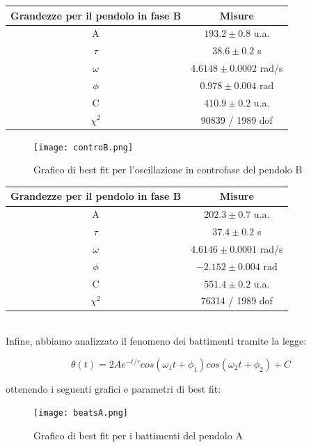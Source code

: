 \documentclass{article}
\begin{document}
\begin{center}
\begin{tabular}{cc}
    \toprule
    Grandezze per il pendolo in fase B & Misure \\
     \midrule
    A & $193.2 \pm 0.8$ u.a.\\
    $\tau$ & $38.6 \pm 0.2$ s\\
    $\omega$ & $4.6148 \pm 0.0002$ rad/s\\
    $\phi$ & $0.978 \pm 0.004$ rad\\
    C & $410.9 \pm 0.2$ u.a.\\
    $\chi^2$ & 90839 / 1989 dof\\
    \bottomrule
\end{tabular}
\end{center}

\begin{figure} [H]
    \centering
    \texttt{[image: controB.png]}
    \caption{Grafico di best fit per l'oscillazione in controfase del pendolo B}
    \label{fig:controB}
\end{figure}

\begin{center}
\begin{tabular}{cc}
    \toprule
    Grandezze per il pendolo in fase B & Misure \\
     \midrule
    A & $202.3 \pm 0.7$ u.a.\\
    $\tau$ & $37.4 \pm 0.2$ s\\
    $\omega$ & $4.6146 \pm 0.0001$ rad/s\\
    $\phi$ & $-2.152 \pm 0.004$ rad\\
    C & $551.4 \pm 0.2$ u.a.\\
    $\chi^2$ & 76314 / 1989 dof\\
    \bottomrule
\end{tabular}
\end{center}
\\
\vspace{1em}
Infine, abbiamo analizzato il fenomeno dei battimenti tramite la legge:

\begin{equation}
    \theta(t) = 2Ae^{-t/\tau}cos(\omega_1 t + \phi_1)cos(\omega_2 t + \phi_2) + C 
\end{equation}

ottenendo i seguenti grafici e parametri di best fit:

\begin{figure} [H]
    \centering
    \texttt{[image: beatsA.png]}
    \caption{Grafico di best fit per i battimenti del pendolo A}
    \label{fig:my_label}
\end{figure}
\end{document}

